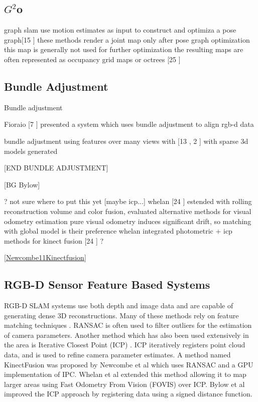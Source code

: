 
\subsection{$G^2$o}

graph slam use motion estimates as input to construct and optimiza a pose graph[15 \cite{Kummerle11G}] these methods render a joint map only after pose graph optimization
this map is generally not used for further optimization
the resulting maps are often represented as occupancy grid maps or octrees [25 \cite{Wurm10Octomap}]




\subsection{Bundle Adjustment}

Bundle adjustment \cite{Lourakis09Sba}

Fioraio [7 \cite{Fioraio11Realtime}] presented a system which uses bundle adjustment to align rgb-d data


bundle adjustment using features over many views with [13 \cite{Klein07Parallel} , 2 \cite{Agarwal09Building}] with sparse 3d models generated

[END BUNDLE ADJUSTMENT]



[BG Bylow]

? not sure where to put this yet [maybe icp...]
whelan [24 \cite{Whelan13Robust}] estended with rolling reconstruction volume and color fusion, evaluated alternative methods for visual odometry estimation
pure visual odometry induces significant drift, so matching with global model is their preference
whelan integrated photometric + icp methods for kinect fusion [24 \cite{Whelan13Robust}]
?






\ref{Newcombe11Kinectfusion}

\subsection{RGB-D Sensor Feature Based Systems}
RGB-D SLAM systems use both depth and image data and are capable of generating dense 3D reconstructions. Many of these methods rely on feature matching techniques \cite{Engelhard11Real,Henry10Rgb,Endres12Evaluation}. RANSAC is often used to filter outliers for the estimation of camera parameters\cite{Engelhard11Real,Henry10Rgb,Endres12Evaluation}. Another method which has also been used extensively in the area is Iterative Closest Point (ICP) \cite{Engelhard11Real,Henry10Rgb,Bylow13Real,Newcombe11Kinectfusion,Stuckler12Robust,Izadi11Kinectfusion}. ICP iteratively registers point cloud data, and is used to refine camera parameter estimates. A method named KinectFusion was proposed by Newcombe et al \cite{Newcombe11Kinectfusion} which uses RANSAC and a GPU implementation of IPC. Whelan et al \cite{Whelan12Kintinuous} extended this method allowing it to map larger areas using Fast Odometry From Vision (FOVIS) over ICP. Bylow et al \cite{Bylow13Real} improved the ICP approach by registering data using a signed distance function.

